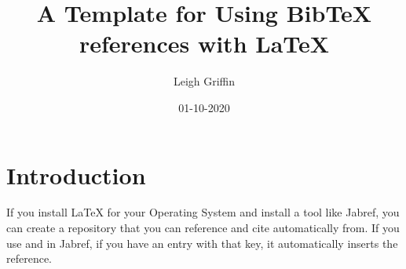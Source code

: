 \documentclass[12pt]{article}
\begin{document}
\title{A Template for Using BibTeX references with LaTeX}
\author{Leigh Griffin}
\date{01-10-2020}

\maketitle

\section{Introduction}
If you install LaTeX for your Operating System and install a tool like Jabref, you can create a repository that you can reference and cite automatically from.
If you use \cite{Sanjay2013} and in Jabref, if you have an entry with that key, it automatically inserts the reference.










\end{document}
